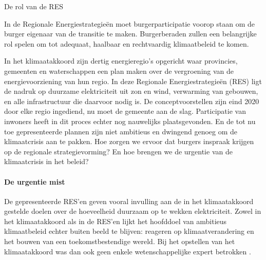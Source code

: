 \begin{voorstel}{De rol van de RES}


\begin{samenvatting}
In de Regionale Energiestrategieën moet burgerparticipatie voorop staan om de burger eigenaar van de transitie te maken. Burgerberaden zullen een belangrijke rol spelen om tot adequaat, haalbaar en rechtvaardig klimaatbeleid te komen.
\end{samenvatting}

\begin{multicols*}{2}

\begin{uitdaging}
In het klimaatakkoord zijn dertig energieregio’s opgericht waar provincies, gemeenten en waterschappen een plan maken over de vergroening van de energievoorziening van hun regio. In deze Regionale Energiestrategieën (RES) ligt de nadruk op duurzame elektriciteit uit zon en wind, verwarming van gebouwen, en alle infrastructuur die daarvoor nodig is. De conceptvoorstellen zijn eind 2020 door elke regio ingediend, nu moet de gemeente aan de slag.
Participatie van inwoners heeft in dit proces echter nog nauwelijks plaatsgevonden. En de tot nu toe gepresenteerde plannen zijn niet ambitieus en dwingend genoeg om de klimaatcrisis aan te pakken.
Hoe zorgen we ervoor dat burgers inspraak krijgen op de regionale strategievorming? En hoe brengen we de urgentie van de klimaatcrisis in het beleid?
\end{uitdaging}

\begin{overwegingen}

\paragraph{De urgentie mist}
De gepresenteerde RES'en geven vooral invulling aan de in het klimaatakkoord gestelde doelen over de hoeveelheid duurzaam op te wekken elektriciteit.
Zowel in het klimaatakkoord als in de RES'en lijkt het hoofddoel van ambitieus klimaatbeleid echter buiten beeld te blijven: reageren op klimaatverandering en het bouwen van een toekomstbestendige wereld. Bij het opstellen van het klimaatakkoord was dan ook geen enkele wetenschappelijke expert betrokken \parencite{kropman_hoe_2019}.


\end{overwegingen}
\end{multicols*}
\end{voorstel}
